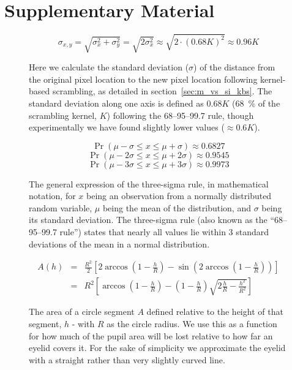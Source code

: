 \chapter{Supplementary Material}
    \begin{figure}[H]
	\[ \sigma_{x,y} = \sqrt{\sigma_{x}^{2}+\sigma_{y}^{2}} = \sqrt{2\sigma_{x}^{2}} \approx \sqrt{2 \cdot (0.68 K)^{2}} \approx 0.96K\]
	\caption{Here we calculate the standard deviation ($\sigma$) of the distance from the original pixel location to the new pixel location following kernel-based scrambling, as detailed in section~\ref{sec:m_vs_si_kbs}. The standard deviation along one axis is defined as $0.68K$ (\SI{68}{\percent} of the scrambling kernel, $K$) following the 68–95–99.7 rule, though experimentally we have found slightly lower values ($\approx 0.6K$).}
	\label{eq:lrgn}
    \end{figure}
    \begin{figure}[H]
	\[\Pr(\mu - \sigma \le x \le \mu + \sigma) \approx 0.6827 \]
	\[\Pr(\mu - 2\sigma \le x \le \mu + 2\sigma) \approx 0.9545 \]
	\[\Pr(\mu - 3\sigma \le x \le \mu + 3\sigma) \approx 0.9973 \]
	\caption{The general expression of the three-sigma rule, in mathematical notation, for $x$ being an observation from a normally distributed random variable, $\mu$ being the mean of the distribution, and $\sigma$ being its standard deviation. The three-sigma rule (also known as the “68–95–99.7 rule”) states that nearly all values lie within 3 standard deviations of the mean in a normal distribution.}
	\label{eq:3s}
    \end{figure}
    \begin{figure}[H]
	\begin{eqnarray*}
	    A(h)&=&\frac{R^2}{2}\left[2\arccos\left(1-\frac{h}{R}\right) - \sin\left(2 \arccos\left(1-\frac{h}{R}\right)\right) \right]\\
	    &=&R^2 \left [\arccos{\left (1-\frac{h}{R}\right)} - \left (1-\frac{h}{R}\right) \sqrt{2 \frac{h}{R} - \frac{h^2}{R^2}} \right]
	\end{eqnarray*}
	\caption{The area of a circle segment $A$ defined relative to the height of that segment, $h$ - with $R$ as the circle radius. We use this as a function for how much of the pupil area will be lost relative to how far an eyelid covers it. For the sake of simplicity we approximate the eyelid with a straight rather than very slightly curved line.}
	\label{eq:cs}
    \end{figure}

